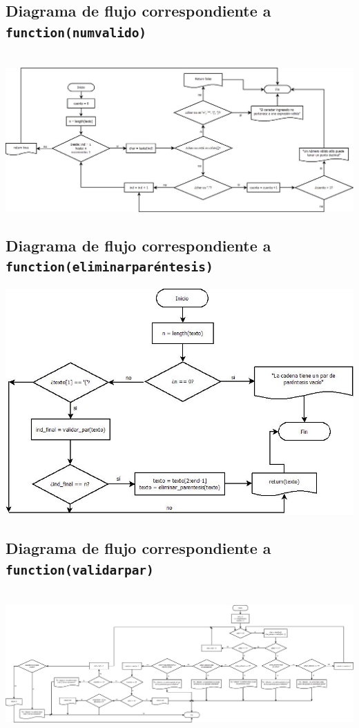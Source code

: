 \documentclass{article}
\begin{document}
\begin{landscape}
    \subsection{Diagrama de flujo correspondiente a \texttt{function(num\textunderscore valido)}}\\
\includegraphics[scale=0.65]{Diagrama2.jpeg}
\end{landscape}

\subsection{Diagrama de flujo correspondiente a \texttt{function(eliminar\textunderscore paréntesis)}}
\includegraphics[scale=0.8]{Diagrama3.jpeg}

\begin{landscape}
    \subsection{Diagrama de flujo correspondiente a \texttt{function(validar\textunderscore par)}}\\
\includegraphics[scale=0.32]{Diagrama4.jpeg}
\end{landscape}
\end{document}
